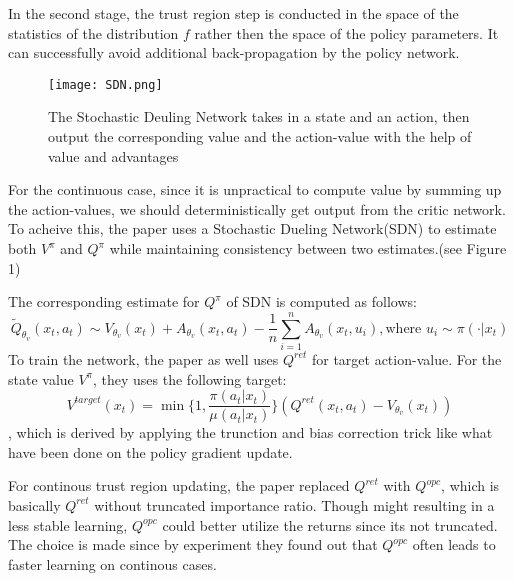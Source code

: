 In the second stage, the trust region step is conducted in the space of the statistics of the distribution $f$ rather then the space of the policy parameters. 
It can successfully avoid additional back-propagation by the policy network.

\begin{figure}
\caption{The Stochastic Deuling Network takes in a state and an action, 
then output the corresponding value and the action-value with the help of value and advantages}
\texttt{[image: SDN.png]}
\end{figure}

For the continuous case, since it is unpractical to compute value by summing up the action-values, 
we should deterministically get output from the critic network.
To acheive this, the paper uses a Stochastic Dueling Network(SDN) to estimate both $V^\pi$ and $Q^\pi$
while maintaining consistency between two estimates.(see Figure 1)

The corresponding estimate for $Q^\pi$ of SDN is computed as follows:
\[
  \tilde{Q}_{\theta_v}(x_t, a_t) \sim V_{\theta_v}(x_t) + A_{\theta_v}(x_t, a_t) - \frac{1}{n}\sum_{i = 1}^n A_{\theta_v}(x_t, u_i), \text{where } u_i \sim \pi(\cdot | x_t)
\]
To train the network, the paper as well uses $Q^{ret}$ for target action-value.
For the state value $V^\pi$, they uses the following target:
\[
    V^{target}(x_t) = \min\{1, \frac{\pi(a_t|x_t)}{\mu(a_t | x_t)}\} (Q^{ret}(x_t, a_t) - V_{\theta_v}(x_t))
\]
, which is derived by applying the trunction and bias correction trick like what have been done on the policy gradient update.

For continous trust region updating, the paper replaced $Q^{ret}$ with $Q^{opc}$, 
which is basically $Q^{ret}$ without truncated importance ratio.
Though might resulting in a less stable learning, $Q^{opc}$ could better utilize the returns since its not truncated.
The choice is made since by experiment they found out that $Q^{opc}$ often leads to faster learning on continous cases.
